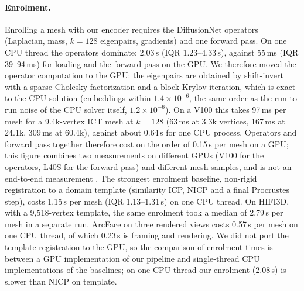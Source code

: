 \paragraph{Enrolment.}
Enrolling a mesh with our encoder requires the DiffusionNet
operators~\cite{diffusionet} (Laplacian, mass, $k=128$ eigenpairs, gradients)
and one forward pass. On one CPU thread the operators dominate: 2.03\,s
(IQR 1.23--4.33\,s), against 55\,ms (IQR 39--94\,ms) for loading and the
forward pass on the GPU.
We therefore moved the operator computation to the GPU: the eigenpairs are
obtained by shift-invert with a sparse Cholesky factorization and a block
Krylov iteration, which is exact to the CPU solution (embeddings within
$1.4\times10^{-6}$, the same order as the run-to-run noise of the CPU solver
itself, $1.2\times10^{-6}$).
On a V100 this takes 97\,ms per mesh for a 9.4k-vertex ICT mesh at $k=128$
(63\,ms at 3.3k vertices, 167\,ms at 24.1k, 309\,ms at 60.4k), against about
0.64\,s for one CPU process.
Operators and forward pass together therefore cost on the order of 0.15\,s per
mesh on a GPU; this figure combines two measurements on different GPUs (V100
for the operators, L40S for the forward pass) and different mesh samples, and
is not an end-to-end measurement
.
The strongest enrolment baseline, non-rigid registration to a domain template
(similarity ICP, NICP and a final Procrustes step), costs 1.15\,s per mesh
(IQR 1.13--1.31\,s) on one CPU thread.
On HIFI3D, with a 9{,}518-vertex template, the same enrolment took a median
of 2.79\,s per mesh in a separate run.
ArcFace on three rendered views costs 0.57\,s per mesh on one CPU thread, of
which 0.23\,s is framing and rendering.
We did not port the template registration to the GPU, so the comparison of
enrolment times is between a GPU implementation of our pipeline and
single-thread CPU implementations of the baselines; on one CPU thread our
enrolment (2.08\,s) is slower than NICP on template.

